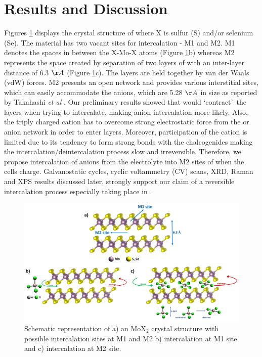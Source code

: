 \section{Results and Discussion}
Figures \ref{Figures/chap4fig:crys} displays the crystal structure of  where X is sulfur (S) and/or selenium (Se). The material has two vacant sites for intercalation - M1 and M2. M1 denotes the spaces in between the X-Mo-X atoms (Figure \ref{Figures/chap4fig:crys}b) whereas M2 represents the space created by separation of two layers of  with an inter-layer distance of 6.3 $\AA$ (Figure \ref{Figures/chap4fig:crys}c). The layers are held together by van der Waals (vdW) forces. M2 presents an open network and provides various interstitial sites, which can easily accommodate the  anions, which are 5.28 $\AA$ in size as reported by Takahashi {\it et al} \cite{takahashi_niv2o5nh2o_2005}. Our preliminary results showed that  would \lq contract\rq\ the  layers when trying to intercalate, making  anion intercalation more likely. Also, the triply charged  cation has to overcome strong electrostatic force from the  or  anion network in order to enter  layers. Moreover, participation of the cation is limited due to its tendency to form strong bonds with the chalcogenides making the intercalation/deintercalation process slow and irreversible. Therefore, we propose intercalation of  anions from the electrolyte into M2 sites of  when the cells charge. Galvanostatic cycles, cyclic voltammetry (CV) scans, XRD, Raman and XPS results discussed later, strongly support our claim of a reversible intercalation process especially taking place in  . 

\begin{figure}[htb!]
\centering
\includegraphics[width=\textwidth]{Figures/chap4fig/crys}
\caption{Schematic representation of a) an MoX$_2$ crystal structure with possible intercalation sites at M1 and M2 b) intercalation at M1 site and c) intercalation at M2 site.}
 \label{Figures/chap4fig:crys}
\end{figure}


